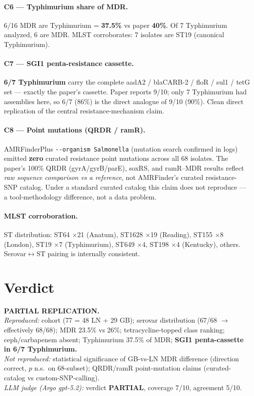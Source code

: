 \documentclass[11pt]{article}
\begin{document}
\paragraph{C6 --- Typhimurium share of MDR.}
6/16 MDR are Typhimurium = \textbf{37.5\%} vs paper \textbf{40\%}. Of 7 Typhimurium analyzed, 6 are MDR.
MLST corroborates: 7 isolates are ST19 (canonical Typhimurium).

\paragraph{C7 --- SGI1 penta-resistance cassette.}
\textbf{6/7 Typhimurium} carry the complete aadA2 / blaCARB-2 / floR / sul1 / tetG set --- exactly the paper's
cassette. Paper reports 9/10; only 7 Typhimurium had assemblies here, so 6/7 (86\%) is the direct analogue
of 9/10 (90\%). Clean direct replication of the central resistance-mechanism claim.

\paragraph{C8 --- Point mutations (QRDR / ramR).}
AMRFinderPlus \texttt{-{}-organism Salmonella} (mutation search confirmed in logs) emitted \textbf{zero}
curated resistance point mutations across all 68 isolates. The paper's 100\% QRDR (gyrA/gyrB/parE), soxRS,
and ramR--MDR results reflect \emph{raw sequence comparison vs a reference}, not AMRFinder's curated
resistance-SNP catalog. Under a standard curated catalog this claim does not reproduce --- a tool-methodology
difference, not a data problem.

\paragraph{MLST corroboration.}
ST distribution: ST64 $\times$21 (Anatum), ST1628 $\times$19 (Reading), ST155 $\times$8 (London),
ST19 $\times$7 (Typhimurium), ST649 $\times$4, ST198 $\times$4 (Kentucky), others. Serovar$\leftrightarrow$ST
pairing is internally consistent.

\section{Verdict}

\textbf{PARTIAL REPLICATION.}\\
\emph{Reproduced:} cohort (77 = 48 LN + 29 GB); serovar distribution (67/68 $\to$ effectively 68/68);
MDR 23.5\% vs 26\%; tetracycline-topped class ranking; ceph/carbapenem absent; Typhimurium 37.5\% of MDR;
\textbf{SGI1 penta-cassette in 6/7 Typhimurium.}\\
\emph{Not reproduced:} statistical significance of GB-vs-LN MDR difference (direction correct, $p$ n.s.\ on
68-subset); QRDR/ramR point-mutation claims (curated-catalog vs custom-SNP-calling).\\
\emph{LLM judge (Argo gpt-5.2):} verdict \textbf{PARTIAL}, coverage 7/10, agreement 5/10.
\end{document}

